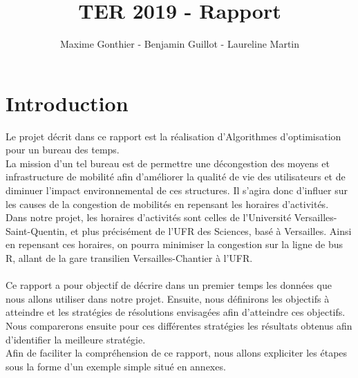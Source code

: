 \documentclass[a4paper,11pt]{article}
\title{TER 2019 - Rapport}
\author{Maxime Gonthier - Benjamin Guillot - Laureline Martin}
\begin{document}
\clearpage
\maketitle

\newpage
\tableofcontents

\newpage
\section{Introduction}
	Le projet décrit dans ce rapport est la réalisation d'Algorithmes d'optimisation pour un bureau des temps.\\
	La mission d'un tel bureau est de permettre une décongestion des moyens et infrastructure de mobilité afin d'améliorer la qualité de vie des utilisateurs et de diminuer l'impact environnemental de ces structures. Il s'agira donc d'influer sur les causes de la congestion de mobilités en repensant les horaires d'activités.\\
	Dans notre projet, les horaires d'activités sont celles de l'Université Versailles-Saint-Quentin, et plus précisément de l'UFR des Sciences, basé à Versailles. Ainsi en repensant ces horaires, on pourra minimiser la congestion sur la ligne de bus R, allant de la gare transilien Versailles-Chantier à l'UFR.\\
	\\
	Ce rapport a pour objectif de décrire dans un premier temps les données que nous allons utiliser dans notre projet. Ensuite, nous définirons les objectifs à atteindre et les stratégies de résolutions envisagées afin d'atteindre ces objectifs. Nous comparerons ensuite pour ces différentes stratégies les résultats obtenus afin d'identifier la meilleure stratégie.\\
	Afin de faciliter la compréhension de ce rapport, nous allons expliciter les étapes sous la forme d'un exemple simple situé en annexes.
	
	
\end{document}
